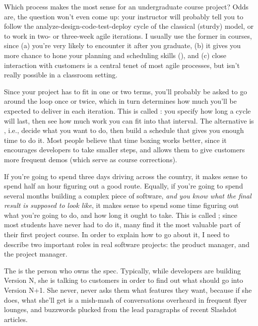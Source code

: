 \documentclass{report}
\begin{document}
Which process makes the most sense for an undergraduate course
project?  Odds are, the question won't even come up: your instructor
will probably tell you to follow the analyze-design-code-test-deploy
cycle of the classical (sturdy) model, or to work in two- or
three-week agile iterations.  I usually use the former in courses,
since (a) you're very likely to encounter it after you graduate, (b)
it gives you more chance to hone your planning and scheduling skills
(), and (c) close interaction with
customers is a central tenet of most agile processes, but isn't really
possible in a classroom setting.

Since your project has to fit in one or two terms, you'll probably be
asked to go around the loop once or twice, which in turn determines
how much you'll be expected to deliver in each iteration.  This is
called : you specify how long a cycle will last,
then see how much work you can fit into that interval.  The
alternative is , i.e., decide what you want to
do, then build a schedule that gives you enough time to do it.  Most
people believe that time boxing works better, since it encourages
developers to take smaller steps, and allows them to give customers
more frequent demos (which serve as course corrections).


If you're going to spend three days driving across the country, it
makes sense to spend half an hour figuring out a good route.  Equally,
if you're going to spend several months building a complex piece of
software, \emph{and you know what the final result is supposed to look
like}, it makes sense to spend some time figuring out what you're
going to do, and how long it ought to take.  This is called
; since most students have never had to do it,
many find it the most valuable part of their first project course.  In
order to explain how to go about it, I need to describe two important
roles in real software projects: the product manager, and the project
manager.

The  is the person who owns the spec.
Typically, while developers are building Version N, she is talking to
customers in order to find out what should go into Version N+1.  She
never, never asks them what features they want, because if she does,
what she'll get is a mish-mash of conversations overheard in frequent
flyer lounges, and buzzwords plucked from the lead paragraphs of
recent Slashdot articles.
\end{document}
